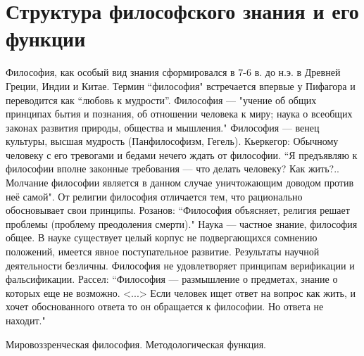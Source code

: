 \documentclass[12pt]{article}
\begin{document}
\newpage
\section{Структура философского знания и его функции}
Философия, как особый вид знания сформировался в 7-6 в. до н.э. в Древней Греции, Индии и Китае. Термин
``философия" встречается впервые у Пифагора и переводится как ``любовь к мудрости”.
Философия --- "учение об общих
принципах бытия и познания, об отношении человека к миру; наука о всеобщих законах развития природы,
общества и мышления." Философия --- венец культуры, высшая мудрость (Панфилософизм, Гегель).
Кьеркегор:
Обычному человеку с его тревогами и бедами нечего ждать от философии. ``Я предъявляю к философии вполне
законные  требования --- что  делать  человеку?
Как  жить?.. Молчание  философии  является  в  данном  случае
уничтожающим  доводом  против  неё  самой".
От  религии  философия  отличается  тем,  что  рационально
обосновывает  свои  принципы. Розанов: ``Философия  объясняет,  религия  решает  проблемы  (проблему
преодоления  смерти)." Наука --- частное  знание,
философия  общее.  В  науке  существует  целый  корпус  не
подвергающихся  сомнению  положений,  имеется  явное  поступательное  развитие.  Результаты  научной
деятельности  безличны.  Философия  не  удовлетворяет  принципам  верификации  и  фальсификации.
Рассел: ``Философия --- размышление о предметах, знание о которых еще не возможно. <...>
Если человек ищет ответ на вопрос
как  жить,  и  хочет  обоснованного  ответа  то  он  обращается  к  философии.  Но  ответа  не  находит."


Мировоззренческая философия. Методологическая функция. 
\end{document}
